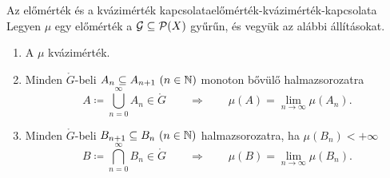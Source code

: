 \documentclass[
]{elteikthesis}[2024/04/26]
\begin{document}
	\begin{theorem}{Az előmérték és a kvázimérték kapcsolata}{előmérték-kvázimérték-kapcsolata}
		Legyen \( \mu \) egy előmérték a \( \mathcal{G} \subseteq \mathcal{P}( X ) \) gyűrűn,
		és vegyük az alábbi állításokat.
		\begin{enumerate}[label=\alph*)]
			\item\label{eq:kvázimérték-jellemzése-01} A \( \mu \) kvázimérték.
			
			\item\label{eq:kvázimérték-jellemzése-02}
			Minden \( \ring{G} \)-beli \( A_n \subseteq A_{n + 1} \ (n \in \mathbb{N}) \) 
			monoton bővülő halmazsorozatra
			\[
				A \coloneq \bigcup_{n=0}^{\infty} A_n \in \ring{G}
				\qquad \Longrightarrow \qquad
				\mu(A) = \lim_{n \to \infty} \mu(A_n).
			\]
			
			\item\label{eq:kvázimérték-jellemzése-03}
			Minden \( \ring{G} \)-beli \( B_{n + 1} \subseteq B_n \ (n \in \mathbb{N}) \)
			halmazsorozatra, ha \( \mu(B_n) < +\infty \)
			\[
				B \coloneq \bigcap_{n=0}^{\infty} B_n \in \ring{G}
				\qquad \Longrightarrow \qquad
				\mu(B) = \lim_{n \to \infty} \mu(B_n).
			\]
			

\end{enumerate}
\end{theorem}
\end{document}
